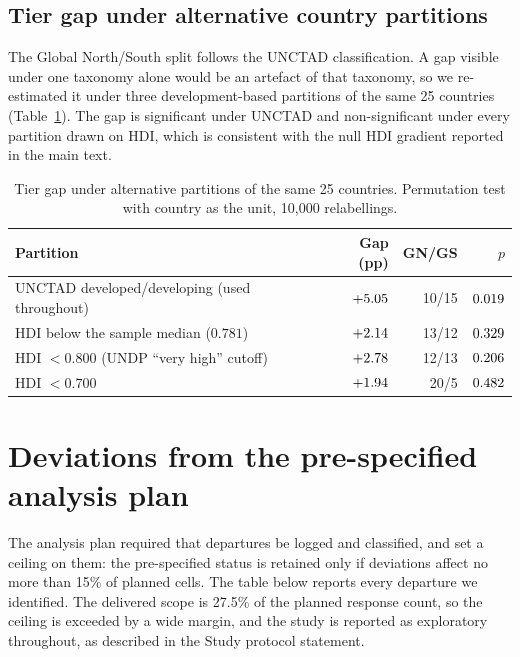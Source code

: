 \documentclass[11pt,a4paper]{article}
\begin{document}

\subsection{Tier gap under alternative country partitions}

The Global North/South split follows the UNCTAD classification. A gap visible
under one taxonomy alone would be an artefact of that taxonomy, so we re-estimated
it under three development-based partitions of the same 25 countries
(Table~\ref{tab:taxonomy}). The gap is significant under UNCTAD and
non-significant under every partition drawn on HDI, which is consistent with the
null HDI gradient reported in the main text.

\begin{table}[h]
\centering
\caption{Tier gap under alternative partitions of the same 25 countries.
Permutation test with country as the unit, 10{,}000 relabellings.}
\label{tab:taxonomy}
\footnotesize
\setlength{\tabcolsep}{4pt}
\begin{tabular}{lrrr}
\toprule
Partition & Gap (pp) & GN/GS & $p$ \\
\midrule
UNCTAD developed/developing (used throughout) & $+5.05$ & 10/15 & $0.019$ \\
HDI below the sample median ($0.781$) & $+2.14$ & 13/12 & $0.329$ \\
HDI $<0.800$ (UNDP ``very high'' cutoff) & $+2.78$ & 12/13 & $0.206$ \\
HDI $<0.700$ & $+1.94$ & 20/5 & $0.482$ \\
\bottomrule
\end{tabular}
\end{table}

\section{Deviations from the pre-specified analysis plan}\label{sec:s-deviations}

The analysis plan required that departures be logged and classified, and set a
ceiling on them: the pre-specified status is retained only if deviations affect no
more than 15\% of planned cells. The table below reports every departure we
identified. The delivered scope is 27.5\% of the planned response count, so the
ceiling is exceeded by a wide margin, and the study is reported as exploratory
throughout, as described in the Study protocol statement.
\end{document}
